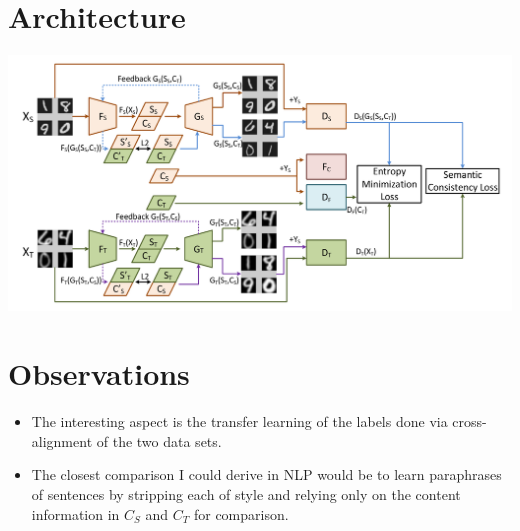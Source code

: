 \documentclass[12pt]{article}
\begin{document}
\section{Architecture}
  \includegraphics[width=\textwidth]{architecture}

\section{Observations}
  \begin{itemize}
    \item The interesting aspect is the transfer learning of the labels done via cross-alignment of the two data sets.
    \item The closest comparison I could derive in NLP would be to learn paraphrases of sentences by stripping each of style and relying only on the content information in $C_S$ and $C_T$ for comparison.
  \end{itemize}
\end{document}
